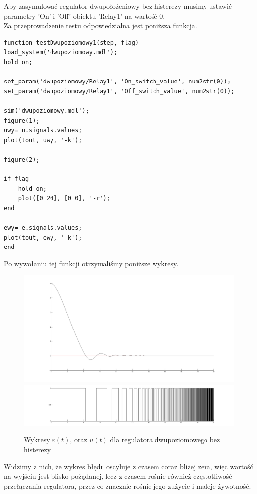 \documentclass[a4paper,10pt]{article}
\begin{document}
Aby zasymulować regulator dwupołożeniowy bez histerezy musimy ustawić parametry 'On' i 'Off' obiektu 'Relay1' na wartość 0. \\
Za przeprowadzenie testu odpowiedzialna jest poniższa funkcja.

\begin{lstlisting}[caption=Funkcja testująca regulator dwupoziomowy bez histerezy.]
function testDwupoziomowy1(step, flag)
load_system('dwupoziomowy.mdl');
hold on;

set_param('dwupoziomowy/Relay1', 'On_switch_value', num2str(0));
set_param('dwupoziomowy/Relay1', 'Off_switch_value', num2str(0));

sim('dwupoziomowy.mdl');
figure(1);
uwy= u.signals.values;    
plot(tout, uwy, '-k');

figure(2);

if flag
    hold on;
    plot([0 20], [0 0], '-r');
end

ewy= e.signals.values;    
plot(tout, ewy, '-k');
end
\end{lstlisting}

Po wywołaniu tej funkcji otrzymaliśmy poniższe wykresy.

\begin{figure}[!h]
    \centering
	\includegraphics[width=120mm]{CW3-dwupolozeniowy-e-a0.png}
	\includegraphics[width=120mm]{CW3-dwupolozeniowy-u-a0.png}
	\caption{Wykresy $\varepsilon(t)$, oraz $u(t)$ dla regulatora dwupoziomowego bez histerezy.}
    \label{fig:Rysunek}
\end{figure}

\newpage Widzimy z nich, że wykres błędu oscyluje z czasem coraz bliżej zera, więc wartość na wyjściu jest blisko pożądanej, lecz z czasem rośnie również częstotliwość przełączania regulatora, przez co znacznie rośnie jego zużycie i maleje żywotność.
\end{document}
